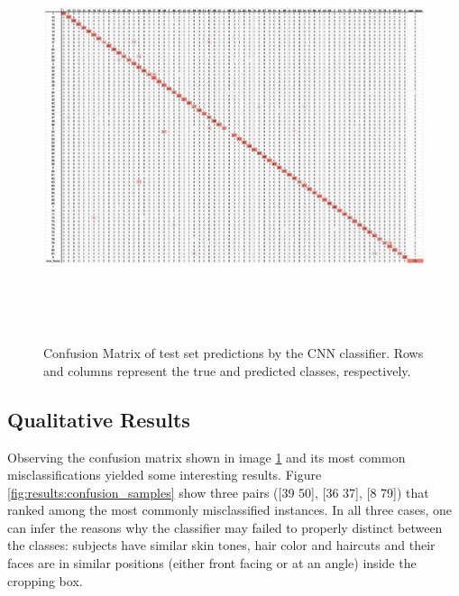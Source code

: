 \documentclass[11pt]{article}
\begin{document}
        \begin{figure}[!h]
            \centering
            \includegraphics[height=12cm]{./Images/results/confusion_matrix.png}
            \caption{Confusion Matrix of test set predictions by the CNN classifier. Rows and columns represent the true and predicted classes, respectively.}
            \label{fig:results:confusion_matrix}
        \end{figure}

    \subsection{Qualitative Results}
        Observing the confusion matrix shown in image \ref{fig:results:confusion_matrix} and its most common misclassifications yielded some interesting results. Figure \ref{fig:results:confusion_samples} show three pairs ([39 50], [36 37],  [8 79]) that ranked among the most commonly misclassified instances. In all three cases, one can infer the reasons why the classifier may failed to properly distinct between the classes: subjects have similar skin tones, hair color and haircuts and their faces are in similar positions (either front facing or at an angle) inside the cropping box.
\end{document}
